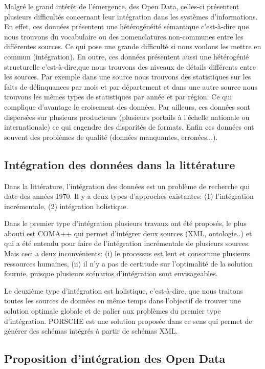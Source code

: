 \documentclass[french]{article}
\begin{document}
Malgré le grand intérêt de l’émergence, des Open Data, celles-ci présentent plusieurs difficultés concernant leur intégration dans 
les systèmes d'informations. En effet, ces données présentent une hétérogénéité sémantique  c'est-à-dire que nous trouvons du 
vocabulaire ou des nomenclatures non-communes entre les différentes sources. Ce qui pose une grande difficulté si nous voulons les mettre en commun (intégration). En outre, ces données présentent aussi une hétérogénié structurelle c'est-à-dire,que nous trouvons des niveaux de détails différents entre les sources. Par exemple dans une source nous trouvons des 
statistiques sur les faits de délinquances par mois et par département et dans une autre source nous trouvons les mêmes 
types de statistiques par année et par région. Ce qui complique d'avantage le croisement des données. Par ailleurs, 
ces données sont dispersées sur plusieurs producteurs (plusieurs portails à l'échelle nationale ou internationale) ce qui engendre des disparités de formats. Enfin ces données ont souvent des problèmes de qualité (données manquantes, erronées...). 

\subsection{Intégration des données dans la littérature}

Dans la littérature, l'intégration des données est un problème de recherche qui date des années 1970. Il y a deux types d'approches existantes:  (1) l'intégration incrémentale, (2) intégration holistique. 

Dans le premier type d'intégration plusieurs travaux ont été proposés, le plus abouti est COMA++ qui permet d'intégrer deux sources (XML, ontologie..) et qui a été entendu pour faire de l'intégration incrémentale de plusieurs sources. Mais ceci  a deux  inconvénients: (i) le processus est lent et consomme plusieurs ressources humaines, (ii) il n'y a pas de certitude sur l'optimalité de la solution fournie, puisque plusieurs scénarios d'intégration sont envisageables. 

 Le deuxième type d'intégration  est holistique, c'est-à-dire, que nous traitons toutes les sources de données en même temps dans l'objectif de trouver une solution optimale globale et de palier aux problèmes du premier type d'intégration.  PORSCHE est une solution proposée dans ce sens qui permet de générer des schémas intégrés à partir de schémas XML. 

\subsection{Proposition d'intégration des Open Data}
\end{document}
